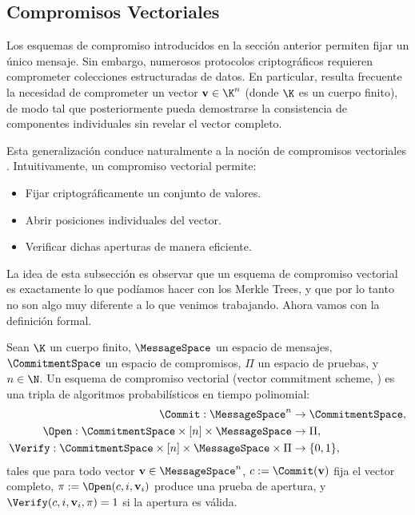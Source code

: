 \subsection{Compromisos Vectoriales}

Los esquemas de compromiso introducidos en la sección anterior permiten fijar un único mensaje. Sin embargo, numerosos protocolos criptográficos requieren comprometer colecciones estructuradas de datos. En particular, resulta frecuente la necesidad de comprometer un vector $\mathbf{v} \in \K^n$ (donde $\K$ es un cuerpo finito), de modo tal que posteriormente pueda demostrarse la consistencia de componentes individuales sin revelar el vector completo.

Esta generalización conduce naturalmente a la noción de compromisos vectoriales \cite{Catalano2013}. Intuitivamente, un compromiso vectorial permite:
\begin{itemize}[itemsep=0.1cm]
	\item Fijar criptográficamente un conjunto de valores.
	\item Abrir posiciones individuales del vector.
	\item Verificar dichas aperturas de manera eficiente.
\end{itemize}

La idea de esta subsección es observar que un esquema de compromiso vectorial es exactamente lo que podíamos hacer con los Merkle Trees, y que por lo tanto no son algo muy diferente a lo que venimos trabajando. Ahora vamos con la definición formal.

\begin{definition}[\VCS]
		Sean $\K$ un cuerpo finito, $\MessageSpace$ un espacio de mensajes, $\CommitmentSpace$ un espacio de compromisos, $\Pi$ un espacio de pruebas, y $n \in \N$. Un esquema de compromiso vectorial (vector commitment scheme, \VCS) es una tripla de algoritmos probabilísticos en tiempo polinomial:
	$$\begin{aligned}
		\Commit: \MessageSpace^n &\to \CommitmentSpace, \\
		\Open: \CommitmentSpace \times [n] \times \MessageSpace &\to \Pi, \\
		\Verify: \CommitmentSpace \times [n] \times \MessageSpace \times \Pi &\to \{0,1\},
	\end{aligned}$$
	tales que para todo vector $\mathbf{v} \in \MessageSpace^n$, $c := \Commit(\mathbf{v})$ fija el vector completo, $\pi := \Open(c, i, \mathbf{v}_i)$ produce una prueba de apertura, y $\Verify(c, i, \mathbf{v}_i, \pi) = 1$ si la apertura es válida.
\end{definition}

